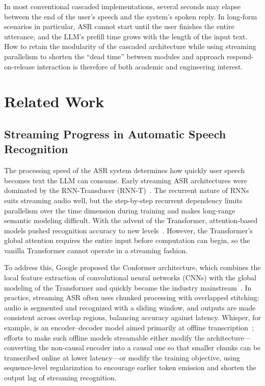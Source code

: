 \documentclass[a4paper,11pt]{article}
\begin{document}
In most conventional cascaded implementations, several seconds may elapse between the end of the user's speech and the system's spoken reply. In long-form scenarios in particular, ASR cannot start until the user finishes the entire utterance, and the LLM's prefill time grows with the length of the input text. How to retain the modularity of the cascaded architecture while using streaming parallelism to shorten the ``dead time'' between modules and approach respond-on-release interaction is therefore of both academic and engineering interest.

\section{Related Work}

\subsection{Streaming Progress in Automatic Speech Recognition}

The processing speed of the ASR system determines how quickly user speech becomes text the LLM can consume. Early streaming ASR architectures were dominated by the RNN-Transducer (RNN-T)~\cite{ref3}. The recurrent nature of RNNs suits streaming audio well, but the step-by-step recurrent dependency limits parallelism over the time dimension during training and makes long-range semantic modeling difficult. With the advent of the Transformer, attention-based models pushed recognition accuracy to new levels~\cite{ref4}. However, the Transformer's global attention requires the entire input before computation can begin, so the vanilla Transformer cannot operate in a streaming fashion.

To address this, Google proposed the Conformer architecture, which combines the local feature extraction of convolutional neural networks (CNNs) with the global modeling of the Transformer and quickly became the industry mainstream~\cite{ref5}. In practice, streaming ASR often uses chunked processing with overlapped stitching: audio is segmented and recognized with a sliding window, and outputs are made consistent across overlap regions, balancing accuracy against latency. Whisper, for example, is an encoder--decoder model aimed primarily at offline transcription~\cite{ref6}; efforts to make such offline models streamable either modify the architecture---converting the non-causal encoder into a causal one so that smaller chunks can be transcribed online at lower latency---or modify the training objective, using sequence-level regularization to encourage earlier token emission and shorten the output lag of streaming recognition.
\end{document}
